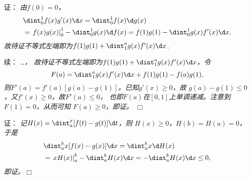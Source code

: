 \begin{frame}
	\linespread{1.5}
	
	\pause
	\small 证：\it 
	由$f(0)=0$，
	\begin{align*}
		&\dint_0^1f(x)g'(x)\d x=\dint_0^1f(x)\d g(x)\\
		&=\left.f(x)g(x)\right|_0^1-\dint_0^1g(x)\d f(x)
		=f(1)g(1)-\dint_0^1g(x)f'(x)\d x.
	\end{align*}
	故待证不等式左端即为$f(1)g(1)+\dint_1^ag(x)f'(x)\d x$.
\end{frame}

\begin{frame}
	\linespread{1.5}
	
	\pause
	\small 续：\it 
	\ldots，	故待证不等式左端即为$f(1)g(1)+\dint_1^ag(x)f'(x)\d x$，令
	$$F(a)=\dint_1^ag(x)f'(x)\d x+f(1)g(1)-f(a)g(1),$$
	则$F'(a)=f'(a)[g(a)-g(1)]$。已知$g'(x)\geq0$，故
	$g(a)-g(1)\leq 0$，又$f'(x)\geq0$，故$F'(a)\leq0$，
	也即$F(a)$在$[0,1]$上单调递减。注意到$F(1)=0$，从而可知
	$F(a)\geq 0$，即证。
	\hfill$\Box$
\end{frame}

\begin{frame}
	\linespread{1.5}
	\ba{\small 3.设$f(x),g(x)$在$[a,b]$上连续，且满足$x\in[a,b)$时，
	$$\dint_a^xf(t)\d t>\dint_a^xg(t)\d t,\;
	\;\dint_a^bf(x)\d x=\dint_a^bg(x)\d x,$$
	证明：$\dint_a^bxf(x)\d x<\dint_a^bxg(x)\d x$。
	}
	
	\pause
	\small 证：\it 
	记$H(x)=\dint_a^x[f(t)-g(t)]\d t$，则
	$H(x)\geq 0$，$H(b)=H(a)=0$，于是
	\begin{align*}
		&\dint_a^bx[f(x)-g(x)]\d x
		=\dint_a^bx\d H(x)\\
		&=\left.xH(x)\right|_a^b-\dint_a^bH(x)\d x
		=-\dint_a^bH(x)\d x\leq 0,
	\end{align*}
	即证。\hfill$\Box$
\end{frame}

